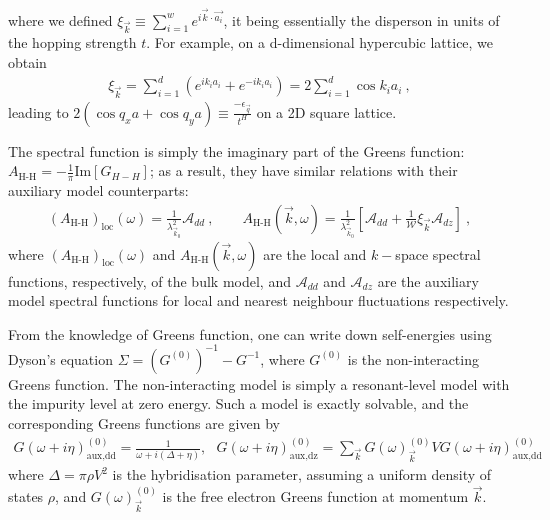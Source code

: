 \documentclass{report}
\numberwithin{equation}{section}
\begin{document}
where we defined \(\xi_{\vec k} \equiv \sum_{i=1}^w e^{i \vec{k}\cdot\vec {a_i}}\), it being essentially the disperson in units of the hopping strength \(t\). For example, on a d-dimensional hypercubic lattice, we obtain
\begin{equation}\begin{aligned}
	\xi_{\vec k} = \sum_{i=1}^d \left(e^{i k_i {a_i}} + e^{-i k_i {a_i}}\right) = 2\sum_{i=1}^d \cos k_i a_i~,
\end{aligned}\end{equation}
leading to \(2(\cos q_{x}a + \cos q_{y}a)\equiv \frac{-\epsilon_{\vec{q}}}{t^{H}}\) on a 2D square lattice. 

The spectral function is simply the imaginary part of the Greens function: \(A_\text{H-H} = -\frac{1}{\pi}\text{Im}\left[G_{H-H}\right] \); as a result, they have similar relations with their auxiliary model counterparts:
\begin{equation}\begin{aligned}
	\left(A_\text{H-H}\right)_\text{loc}(\omega) = \frac{1}{\lambda_{\vec k_0}^2}\mathcal{A}_{dd}~,\qquad A_\text{H-H}(\vec{k},\omega) = \frac{1}{\lambda_{\vec k_0}^2}\left[\mathcal{A}_{dd} + \frac{1}{\mathcal{W}}\xi_{\vec k}\mathcal{A}_{dz} \right]~,
\end{aligned}\end{equation}
where \(\left(A_\text{H-H}\right)_\text{loc}(\omega)\) and \(A_\text{H-H}(\vec{k},\omega)\) are the local and \(k-\)space spectral functions, respectively, of the bulk model, and \(\mathcal{A}_{dd}\) and \(\mathcal{A}_{dz}\) are the auxiliary model spectral functions for local and nearest neighbour fluctuations respectively.

From the knowledge of Greens function, one can write down self-energies using Dyson's equation \(\Sigma = \left(G^{(0)}\right)^{-1} - G^{-1}\), where \(G^{(0)}\) is the non-interacting Greens function. The non-interacting model is simply a resonant-level model with the impurity level at zero energy. Such a model is exactly solvable, and the corresponding Greens functions are given by
\begin{equation}\begin{aligned}
	G(\omega + i\eta)_\text{aux,dd}^{(0)} = \frac{1}{\omega + i\left(\Delta + \eta\right)}, ~ ~ ~ G(\omega + i\eta)_\text{aux,dz}^{(0)} = \sum_{\vec k} G(\omega)^{(0)}_{\vec k} V G(\omega + i\eta)_\text{aux,dd}^{(0)}
\end{aligned}\end{equation}
where \(\Delta = \pi \rho V^2\) is the hybridisation parameter, assuming a uniform density of states \(\rho\), and \(G(\omega)^{(0)}_{\vec k}\) is the free electron Greens function at momentum \(\vec k\). 
\end{document}
